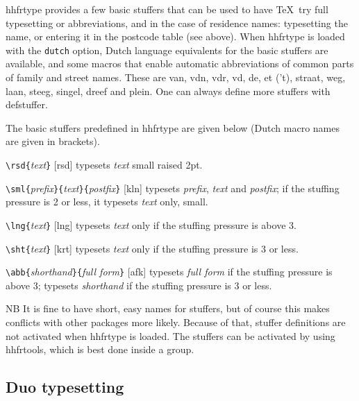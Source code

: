 \documentclass[11pt]{article}
\makeatletter
\def\packagename#1{{\sffamily #1}}     %
\def\macroname#1{{\ttfamily\@ttbs#1}}  %
\def\hhfrtype{\packagename{hhfrtype}\xspace}
\def\={\verb=}
\def\<#1>{\macroname{#1}}
\makeatother
\begin{document}
\hhfrtype provides a few basic stuffers that can be used to
have \TeX\ try full typesetting or abbreviations, and in the
case of residence names: typesetting the name, or entering
it in the postcode table (see above). When \hhfrtype is loaded
with the \texttt{dutch} option, Dutch language equivalents for
the basic stuffers are available, and some macros that enable
automatic abbreviations of common parts of family and street
names. These are \<van>, \<vdn>, \<vdr>, \<vd>, \<de>, \<et> ('t),
\<straat>, \<weg>, \<laan>, \<steeg>, \<singel>, \<dreef> and
\<plein>. One can always define more stuffers with \<defstuffer>.

The basic stuffers predefined in \hhfrtype are given below
(Dutch macro names are given in brackets).

\=\rsd{=\textit{text}\=}= [\<rsd>]
typesets \textit{text} small raised 2pt.

\=\sml{=\textit{prefix}\=}{=\textit{text}\=}{=\textit{postfix}\=}= [\<kln>]
typesets \textit{prefix}, \textit{text} and \textit{postfix}; if the
stuffing pressure is 2 or less, it typesets \textit{text} only, small.

\=\lng{=\textit{text}\=}= [\<lng>]
typesets \textit{text} only if the stuffing pressure is above 3.

\=\sht{=\textit{text}\=}= [\<krt>]
typesets \textit{text} only if the stuffing pressure is 3 or less.

\=\abb{=\textit{shorthand}\=}{=\textit{full form}\=}= [\<afk>]
typesets \textit{full form} if the stuffing pressure is above 3;
typesets \textit{shorthand} if the stuffing pressure is 3 or less.

NB It is fine to have short, easy names for stuffers, but
of course this makes conflicts with other packages more likely.
Because of that, stuffer definitions are not activated when \hhfrtype
is loaded. The stuffers can be activated by using \<hhfrtools>, which
is best done inside a group.

\subsection{Duo typesetting}
\end{document}
